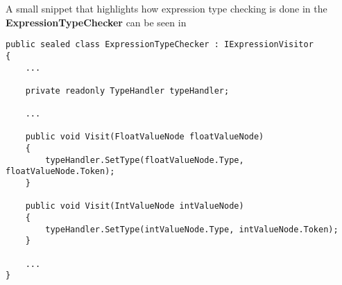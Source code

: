 A small snippet that highlights how expression type checking is done in the \textbf{ExpressionTypeChecker} can be seen in 

\begin{lstlisting}[language=CSharp, caption={Two simple visit methods s for integers and floats in the \textbf{ExpressionTypeChecker} class.}, label={lst:ExpressionTypeChecker},escapechar=|]
public sealed class ExpressionTypeChecker : IExpressionVisitor
{
    ...
    
    private readonly TypeHandler typeHandler;
    
    ...

    public void Visit(FloatValueNode floatValueNode)
    {
        typeHandler.SetType(floatValueNode.Type, floatValueNode.Token);
    }

    public void Visit(IntValueNode intValueNode)
    {
        typeHandler.SetType(intValueNode.Type, intValueNode.Token);
    }

    ...
}
\end{lstlisting}